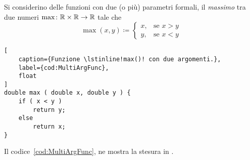 Si considerino delle funzioni con due (o più) parametri formali, il \emph{massimo} tra due numeri $\max\colon\mathbb{R}\times\mathbb{R}\to\mathbb{R}$ tale che 
\[
\mathop{\mathrm{max}}(x,y)\coloneqq
		\begin{cases}
x,	& \text{se } x>y \\
y,	& \text{se } x<y
		\end{cases}
\]
\begin{lstlisting}[
	caption={Funzione \lstinline!max()! con due argomenti.},
	label={cod:MultiArgFunc},
	float
]
double max ( double x, double y ) {
	if ( x < y )
		return y;
	else
		return x;
}
\end{lstlisting}
Il codice~\vref{cod:MultiArgFunc}, ne mostra la stesura in .
